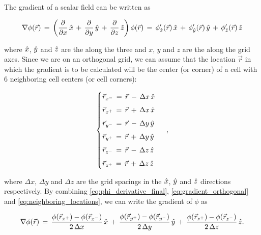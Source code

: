 The gradient of a scalar field can be written as

\begin{equation} \label{eq:gradient_orthogonal}
\nabla\phi(\vec{r}) \,=\, \left(\frac{\partial}{\partial x}\,\hat{x}\,+\,\frac{\partial}{\partial y}\,\hat{y}\,+\,\frac{\partial}{\partial z}\,\hat{z}\right) \phi(\vec{r}) \,=\, \phi'_{\hat{x}}(\vec{r})\,\hat{x}\,+\,\phi'_{\hat{y}}(\vec{r})\,\hat{y}\,+\,\phi'_{\hat{z}}(\vec{r})\,\hat{z}
\end{equation}

where $\hat{x}$, $\hat{y}$ and $\hat{z}$ are the \normalized {} along the three \orthogonal {} and $x$, $y$ and $z$ are the  along the grid axes. Since we are on an orthogonal grid, we can assume that the location $\vec{r}$ in which the gradient is to be calculated will be the center (or corner) of a cell with 6 neighboring cell centers (or cell corners):

\begin{equation} \label{eq:neighboring_locations}
\begin{cases}
\vec{r}_{x^-} \,=\, \vec{r} \,-\, \Delta x\,\hat{x}\\[1ex]
\vec{r}_{x^+} \,=\, \vec{r} \,+\, \Delta x\,\hat{x}\\[1ex]
\vec{r}_{y^-} \,=\, \vec{r} \,-\, \Delta y\,\hat{y}\\[1ex]
\vec{r}_{y^+} \,=\, \vec{r} \,+\, \Delta y\,\hat{y}\\[1ex]
\vec{r}_{z^-} \,=\, \vec{r} \,-\, \Delta z\,\hat{z}\\[1ex]
\vec{r}_{z^+} \,=\, \vec{r} \,+\, \Delta z\,\hat{z}
\end{cases}\ ,
\end{equation}

where $\Delta x$, $\Delta y$ and $\Delta z$ are the grid spacings in the $\hat{x}$, $\hat{y}$ and $\hat{z}$ directions respectively. By combining  \ref{eq:phi_derivative_final}, \ref{eq:gradient_orthogonal} and \ref{eq:neighboring_locations}, we can write the gradient of $\phi$ as

\begin{equation} \label{eq:gradient_final}
\nabla\phi(\vec{r}) \,=\,
\frac{\phi(\vec{r}_{x^+})-\phi(\vec{r}_{x^-})}{2\,\Delta x}\,\hat{x} \,+\,
\frac{\phi(\vec{r}_{y^+})-\phi(\vec{r}_{y^-})}{2\,\Delta y}\,\hat{y} \,+\,
\frac{\phi(\vec{r}_{z^+})-\phi(\vec{r}_{z^-})}{2\,\Delta z}\,\hat{z}.
\end{equation}

